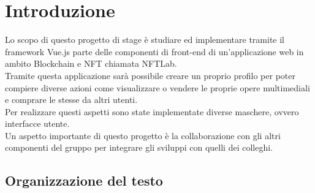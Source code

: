 
\chapter{Introduzione}
\label{cap:introduzione}

Lo scopo di questo progetto di stage è studiare ed implementare tramite il framework Vue.js parte delle componenti di front-end di un'applicazione web in ambito Blockchain e NFT chiamata NFTLab. \\
Tramite questa applicazione sarà possibile creare un proprio profilo per poter compiere diverse azioni come visualizzare o vendere le proprie opere multimediali e comprare le stesse da altri utenti. \\
Per realizzare questi aspetti sono state implementate diverse maschere, ovvero interfacce utente.\\
Un aspetto importante di questo progetto è la collaborazione con gli altri componenti del gruppo per integrare gli sviluppi con quelli dei colleghi.






\section{Organizzazione del testo}

